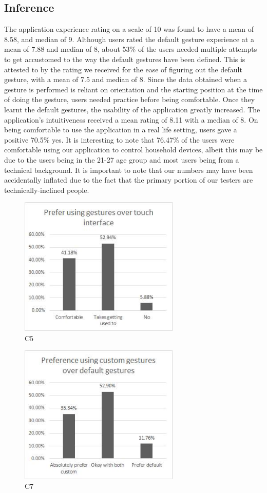 \documentclass[journal]{IEEEtran}
\begin{document}
\subsection{Inference}

The application experience rating on a scale of 10 was found to have a mean of 8.58,  and median of 9. Although users rated the default gesture experience at a mean of 7.88 and median of 8, about 53\% of the users needed multiple attempts to get accustomed to the way the default gestures have been defined. This is attested to by the rating we received for the ease of figuring out the default gesture, with a mean of 7.5 and median of 8. Since the data obtained when a gesture is performed is reliant on orientation and the starting position at the time of doing the gesture, users needed practice before being comfortable. Once they learnt the default gestures, the usability of the application greatly increased. The application's intuitiveness received a mean rating of 8.11 with a median of 8. On being comfortable to use the application in a real life setting, users gave a positive 70.5\% yes. It is interesting to note that 76.47\% of the users were comfortable using our application to control household devices, albeit this may be due to the users being in the 21-27 age group and most users being from a technical background. It is important to note that our numbers may have been accidentally inflated due to the fact that the primary portion of our testers are technically-inclined people. 


\begin{figure}[!t]
\centering
\includegraphics[width=3in]{R5.jpg}
\caption{C5}
\label{fig2}
\end{figure}

\begin{figure}[!t]
\centering
\includegraphics[width=3in]{R6.jpg}
\caption{C7}
\label{fig2}
\end{figure}
\end{document}
